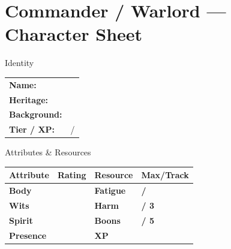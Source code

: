 \documentclass[10pt]{article}
\begin{document}
\newpage

\section*{Commander / Warlord --- Character Sheet}

\begin{minipage}[t]{0.48\linewidth}
    \begin{charbox}{Identity}
        \begin{tabular}{p{2.5cm} p{5cm}}
            \textbf{Name:} & \underline{\hspace{4cm}} \\
            \textbf{Heritage:} & \underline{\hspace{4cm}} \\
            \textbf{Background:} & \underline{\hspace{4cm}} \\
            \textbf{Tier / XP:} & \underline{\hspace{2cm}} / \underline{\hspace{2cm}} \\
        \end{tabular}
    \end{charbox}
    
    \vspace{0.5em}
    
    \begin{charbox}{Attributes \& Resources}
        \begin{tabular}{>{\bfseries}p{2.5cm} >{\bfseries}p{1.5cm} >{\bfseries}p{2.5cm} >{\bfseries}p{1.5cm}}
            \toprule
            \textbf{Attribute} & \textbf{Rating} & \textbf{Resource} & \textbf{Max/Track} \\
            \midrule
            Body & \underline{\hspace{1.5cm}} & Fatigue & \underline{\hspace{1.5cm}} / \underline{\hspace{1.5cm}} \\
            Wits & \underline{\hspace{1.5cm}} & Harm & \underline{\hspace{1.5cm}} / 3 \\
            Spirit & \underline{\hspace{1.5cm}} & Boons & \underline{\hspace{1.5cm}} / 5 \\
            Presence & \underline{\hspace{1.5cm}} & XP & \underline{\hspace{1.5cm}} \\
            \bottomrule
        \end{tabular}
    \end{charbox}
    

\end{minipage}
\end{document}
